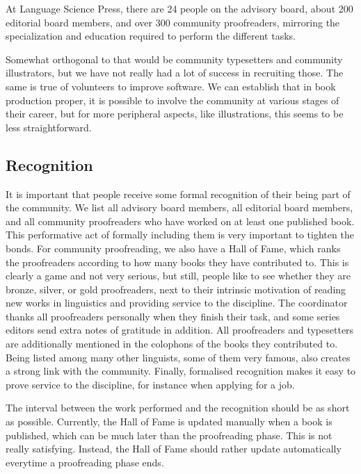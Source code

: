 \documentclass[nonflat,modfonts,output=book] {langsci/langscibook}
\begin{document}
At Language Science Press, there are 24 people on the advisory board, about 200 editorial board members, and over 300 community proofreaders, mirroring the specialization and education required to perform the different tasks. 

Somewhat orthogonal to that would be community typesetters and community illustrators, but we have not really had a lot of success in recruiting those. The same is true of volunteers to improve software. We can establish that in book production proper, it is possible to involve the community at various stages of their career, but for more peripheral aspects, like illustrations, this seems to be less straightforward. 

\subsection{Recognition}
It is important that people receive some formal recognition of their being part of the community. We list all advisory board members, all editorial board members, and all community proofreaders who have worked on at least one published book. This performative act of formally including them is very important to tighten the bonds. For community proofreading, we also have a Hall of Fame, which ranks the proofreaders according to how many books they have contributed to. This is clearly a game and not very serious, but still, people like to see whether they are bronze, silver, or gold proofreaders, next to their intrinsic motivation of reading new works in linguistics and providing service to the discipline. The coordinator thanks all proofreaders personally when they finish their task, and some series editors send extra notes of gratitude in addition. All proofreaders and typesetters are additionally mentioned in the colophons of the books they contributed to. Being listed among many other linguists, some of them very famous, also creates a strong link with the community. Finally, formalised recognition makes it easy to prove service to the discipline, for instance  when applying for a job.

The interval between the work performed and the recognition should be as short as possible. Currently, the Hall of Fame is updated manually when a book is published, which can be much later than the proofreading phase. This is not really satisfying. Instead, the Hall of Fame should rather update automatically everytime a proofreading phase ends.
\end{document}
